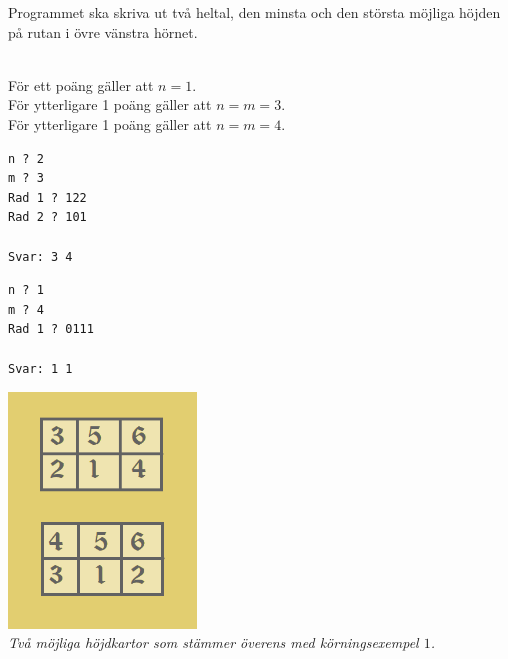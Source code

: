 Programmet ska skriva ut två heltal, den minsta och den största möjliga höjden på rutan i övre vänstra hörnet.

\\
För ett poäng gäller att $n = 1$.\\
För ytterligare 1 poäng gäller att $n = m = 3$.\\
För ytterligare 1 poäng gäller att $n = m = 4$.\\

\vspace{0.5cm}

\setlength\columnsep{30pt}
\begin{multicols}{2}

\begin{verbatim}
n ? 2
m ? 3
Rad 1 ? 122
Rad 2 ? 101

Svar: 3 4
\end{verbatim}

\vspace{0.5cm}
\begin{verbatim}
n ? 1
m ? 4
Rad 1 ? 0111

Svar: 1 1
\end{verbatim}

\vfill\columnbreak
\begin{center}
  \includegraphics[width=5cm]{../skolkval/bergskedja/problem_statement/berg_sample}\\
  \emph{Två möjliga höjdkartor som stämmer överens med körningsexempel $1$.}
\end{center}
\vfill
\end{multicols}





